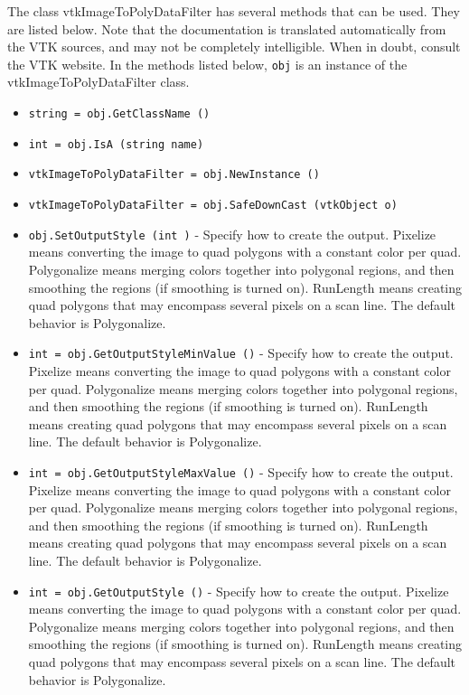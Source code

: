 The class vtkImageToPolyDataFilter has several methods that can be used.
  They are listed below.
Note that the documentation is translated automatically from the VTK sources,
and may not be completely intelligible.  When in doubt, consult the VTK website.
In the methods listed below, \verb|obj| is an instance of the vtkImageToPolyDataFilter class.
\begin{itemize}
\item  \verb|string = obj.GetClassName ()|

\item  \verb|int = obj.IsA (string name)|

\item  \verb|vtkImageToPolyDataFilter = obj.NewInstance ()|

\item  \verb|vtkImageToPolyDataFilter = obj.SafeDownCast (vtkObject o)|

\item  \verb|obj.SetOutputStyle (int )| -  Specify how to create the output. Pixelize means converting the image
 to quad polygons with a constant color per quad. Polygonalize means
 merging colors together into polygonal regions, and then smoothing
 the regions (if smoothing is turned on). RunLength means creating
 quad polygons that may encompass several pixels on a scan line. The
 default behavior is Polygonalize.

\item  \verb|int = obj.GetOutputStyleMinValue ()| -  Specify how to create the output. Pixelize means converting the image
 to quad polygons with a constant color per quad. Polygonalize means
 merging colors together into polygonal regions, and then smoothing
 the regions (if smoothing is turned on). RunLength means creating
 quad polygons that may encompass several pixels on a scan line. The
 default behavior is Polygonalize.

\item  \verb|int = obj.GetOutputStyleMaxValue ()| -  Specify how to create the output. Pixelize means converting the image
 to quad polygons with a constant color per quad. Polygonalize means
 merging colors together into polygonal regions, and then smoothing
 the regions (if smoothing is turned on). RunLength means creating
 quad polygons that may encompass several pixels on a scan line. The
 default behavior is Polygonalize.

\item  \verb|int = obj.GetOutputStyle ()| -  Specify how to create the output. Pixelize means converting the image
 to quad polygons with a constant color per quad. Polygonalize means
 merging colors together into polygonal regions, and then smoothing
 the regions (if smoothing is turned on). RunLength means creating
 quad polygons that may encompass several pixels on a scan line. The
 default behavior is Polygonalize.


\end{itemize}
